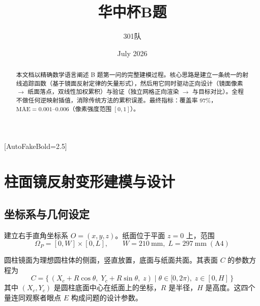 \documentclass[12pt,a4paper]{ctexart}
\begin{document}
\title{华中杯B题}
\author{301队}
\date{July 2026}
\maketitle





[AutoFakeBold=2.5]

\newtheorem{proposition}{命题}[section]
\newtheorem{definition}{定义}[section]
\theoremstyle{remark}
\newtheorem{remark}{注记}[section]


\pagestyle{fancy}
\fancyhf{}
\fancyfoot[C]{\thepage}
\renewcommand{\headrulewidth}{0.4pt}


\begin{abstract}
本文档以精确数学语言阐述 B 题第一问的完整建模过程。核心思路是建立一条统一的射线追踪函数（基于镜面反射定律的矢量形式），然后用它同时驱动正向设计（镜面像素 $\to$ 纸面落点，双线性加权累积）与验证（独立网格正向渲染 $\to$ 与目标对比）。全程不做任何逆映射插值，消除传统方法的累积误差。最终指标：覆盖率 97\%，$\mathrm{MAE}=0.001\text{--}0.006$（像素强度范围 $[0,1]$）。
\end{abstract}
\section{柱面镜反射变形建模与设计}
\subsection{坐标系与几何设定}

建立右手直角坐标系 $O=(x, y, z)$。纸面位于平面 $z=0$ 上，范围
\begin{equation}
    \Omega_P = [0, W]\times[0, L],\qquad W=210\ \mathrm{mm},\; L=297\ \mathrm{mm}\;(\text{A4})
\end{equation}

圆柱镜面为理想圆柱体的侧面，竖直放置，底面与纸面共面。其表面 $C$ 的参数方程为
\begin{equation}
    C = \{\, (X_c + R\cos\theta,\; Y_c + R\sin\theta,\; z) \mid \theta\in[0,2\pi),\; z\in[0,H] \,\}
\end{equation}
其中 $(X_c, Y_c)$ 是圆柱底面中心在纸面上的坐标，$R$ 是半径，$H$ 是高度。这四个量连同观察者眼点 $E$ 构成问题的设计参数。
\end{document}
